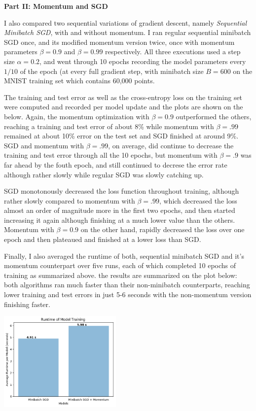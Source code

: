 \documentclass[10pt]{article}
\begin{document}
\begin{multicols}{2}
\noindent
\textbf{Part II: Momentum and SGD}\par 
I also compared two sequential variations of gradient descent, namely \textit{Sequential Minibatch SGD}, with and without momentum. I ran regular sequential minibatch SGD once, and its modified momentum version twice, once with momentum parameters $\beta=0.9$ and $\beta=0.99$ respectively. All three executions used a step size $\alpha = 0.2$, and went through 10 epochs recording the model parameters every $1/10$ of the epoch (at every full gradient step, with minibatch size $B=600$ on the MNIST training set which contains 60,000 points.\par
The training and test error as well as the cross-entropy loss on the training set were computed and recorded per model update and the plots are shown on the below. Again, the momentum optimization with $\beta=0.9$ outperformed the others, reaching a training and test error of about 8\% while momentum with $\beta=.99$ remained at about 10\% error on the test set and SGD finished at around 9\%. SGD and momentum with $\beta=.99$, on average, did continue to decrease the training and test error through all the 10 epochs, but momentum with $\beta=.9$ was far ahead by the fouth epoch, and still continued to decrese the error rate although rather slowly while regular SGD was slowly catching up. \par
SGD monotonously decreased the loss function throughout training, although rather slowly compared to momentum with $\beta = .99$, which decreased the loss almost an order of magnitude more in the first two epochs, and then started increasing it again although finishing at a much lower value than the others. Momentum with $\beta=0.9$ on the other hand, rapidly decreased the loss over one epoch and then plateaued and finished at a lower loss than SGD.\par
Finally, I also averaged the runtime of both, sequential minibatch SGD and it's momentum counterpart over five runs, each of which completed 10 epochs of training as summarized above. the results are summarized on the plot below: both algorithms ran much faster than their non-minibatch counterparts, reaching lower training and test errors in just 5-6 seconds with the non-momentum version finishing faster.
\begin{center}
    \includegraphics[width=0.45\textwidth]{train_time_part2.png}

\end{center}
\end{multicols}
\end{document}

